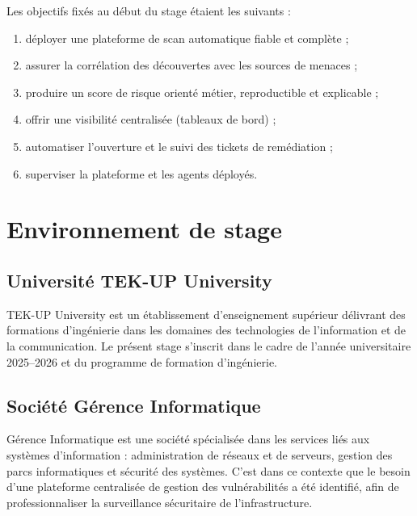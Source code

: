 \documentclass[11pt,a4paper]{article}
\begin{document}
Les objectifs fix\'es au d\'ebut du stage \'etaient les suivants :

\begin{enumerate}[leftmargin=1.6em]
  \item d\'eployer une plateforme de scan automatique fiable et compl\`ete ;
  \item assurer la corr\'elation des d\'ecouvertes avec les sources de
        menaces ;
  \item produire un score de risque orient\'e m\'etier, reproductible et
        explicable ;
  \item offrir une visibilit\'e centralis\'ee (tableaux de bord) ;
  \item automatiser l'ouverture et le suivi des tickets de rem\'ediation ;
  \item superviser la plateforme et les agents d\'eploy\'es.
\end{enumerate}

\section{Environnement de stage}

\subsection{Universit\'e TEK-UP University}

TEK-UP University est un \'etablissement d'enseignement sup\'erieur
d\'elivrant des formations d'ing\'enierie dans les domaines des technologies
de l'information et de la communication. Le pr\'esent stage s'inscrit dans le
cadre de l'ann\'ee universitaire 2025--2026 et du programme de formation
d'ing\'enierie.

\subsection{Soci\'et\'e G\'erence Informatique}

G\'erence Informatique est une soci\'et\'e sp\'ecialis\'ee dans les services
li\'es aux syst\`emes d'information : administration de r\'eseaux et de
serveurs, gestion des parcs informatiques et s\'ecurit\'e des syst\`emes.
C'est dans ce contexte que le besoin d'une plateforme centralis\'ee de gestion
des vuln\'erabilit\'es a \'et\'e identifi\'e, afin de professionnaliser la
surveillance s\'ecuritaire de l'infrastructure.
\end{document}
